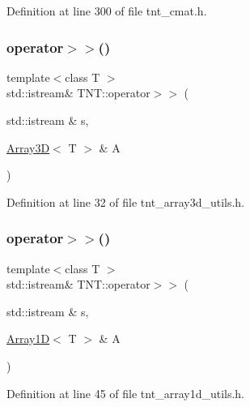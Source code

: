 Definition at line 300 of file tnt\+\_\+cmat.\+h.

\mbox{\label{namespaceTNT_a6657bdc30991a0a8b4dbd2563f52397c}} 
\subsubsection{\texorpdfstring{operator$>$$>$()}{operator>>()}\hspace{0.1cm}{\footnotesize\ttfamily [1/7]}}
{\footnotesize\ttfamily template$<$class T $>$ \\
std\+::istream\& T\+N\+T\+::operator$>$$>$ (\begin{DoxyParamCaption}\item[{std\+::istream \&}]{s,  }\item[{\hyperlink{classTNT_1_1Array3D}{Array3D}$<$ T $>$ \&}]{A }\end{DoxyParamCaption})}



Definition at line 32 of file tnt\+\_\+array3d\+\_\+utils.\+h.

\mbox{\label{namespaceTNT_ac85e172cd409433504bb3a8a6df3ac9f}} 
\subsubsection{\texorpdfstring{operator$>$$>$()}{operator>>()}\hspace{0.1cm}{\footnotesize\ttfamily [2/7]}}
{\footnotesize\ttfamily template$<$class T $>$ \\
std\+::istream\& T\+N\+T\+::operator$>$$>$ (\begin{DoxyParamCaption}\item[{std\+::istream \&}]{s,  }\item[{\hyperlink{classTNT_1_1Array1D}{Array1D}$<$ T $>$ \&}]{A }\end{DoxyParamCaption})}



Definition at line 45 of file tnt\+\_\+array1d\+\_\+utils.\+h.

\mbox{\label{namespaceTNT_a593c4004ec093777d00ecaa7b18ec8ac}} 
